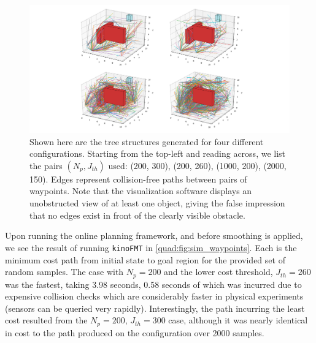 \begin{figure}[!hb]
    \centering
    \hspace*{-2.6cm}
    \includegraphics[scale=0.42]{./figures/sim_all_lines}
    \caption[Quadrotor simulation tree]{Shown here are the tree structures generated for four different configurations. Starting from the top-left and reading across, we list the pairs $(N_p, J_{th})$ used: (200, 300), (200, 260), (1000, 200), (2000, 150). Edges represent collision-free paths between pairs of waypoints. Note that the visualization software displays an unobstructed view of at least one object, giving the false impression that no edges exist in front of the clearly visible obstacle.}
\label{quad:fig:sim_all_lines}
\end{figure}

Upon running the online planning framework, and before smoothing is applied, we see the result of running \texttt{kinoFMT} in \autoref{quad:fig:sim_waypoints}. Each is the minimum cost path from initial state to goal region for the provided set of random samples. The case with $N_p = 200$ and the lower cost threshold, $J_{th} = 260$ was the fastest, taking 3.98 seconds, 0.58 seconds of which was incurred due to expensive collision checks which are considerably faster in physical experiments (sensors can be queried very rapidly). Interestingly, the path incurring the least cost resulted from the $N_p = 200$, $J_{th} = 300$ case, although it was nearly identical in cost to the path produced on the configuration over 2000 samples.

